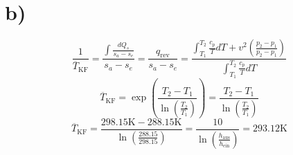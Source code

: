

\section*{b)}
\[
\frac{1}{\overline{T}_{\text{KF}}} = \frac{\int \frac{dQ_s}{s_a - s_e}}{s_a - s_e} = \frac{q_{\text{rev}}}{s_a - s_e} = \frac{\int_{T_1}^{T_2} \frac{c_p}{T} dT + v^2 \left( \frac{p_2 - p_1}{p_2 - p_1} \right)}{\int_{T_1}^{T_2} \frac{c_p}{T} dT}
\]
\[
\overline{T}_{\text{KF}} = \exp \left( \frac{T_2 - T_1}{\ln \left( \frac{T_2}{T_1} \right)} \right) = \frac{T_2 - T_1}{\ln \left( \frac{T_2}{T_1} \right)}
\]
\[
\overline{T}_{\text{KF}} = \frac{298.15 \text{K} - 288.15 \text{K}}{\ln \left( \frac{288.15}{298.15} \right)} = \frac{10}{\ln \left( \frac{h_{\text{aus}}}{h_{\text{ein}}} \right)} = 293.12 \text{K}
\]